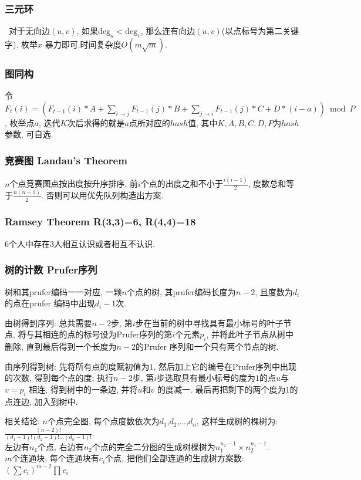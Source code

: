 \subsubsection{三元环}\
			   对于无向边$(u,v)$, 如果$\mathrm{deg}_u<\mathrm{deg}_v$, 那么连有向边$(u,v)$(以点标号为第二关键字). 枚举$x$ 暴力即可.时间复杂度$O(m\sqrt{m})$. 
\subsubsection{图同构}
				令$F_t(i)=(F_{t-1}(i)*A+\sum_{i\to j} F_{t-1}(j)*B+\sum_{j\to i} F_{t-1}(j)*C+D*(i-a)) \bmod P$, 枚举点$a$, 迭代$K$次后求得的就是$a$点所对应的$hash$值, 其中$K,A,B,C,D,P$为$hash$参数, 可自选. 

\subsubsection{竞赛图 Landau's Theorem}
	$n$个点竞赛图点按出度按升序排序, 前$i$个点的出度之和不小于$\frac{i(i-1)}{2}$, 度数总和等于$\frac{n(n-1)}{2}$. 否则可以用优先队列构造出方案.

\subsubsection{Ramsey Theorem R(3,3)=6, R(4,4)=18}
	$6$个人中存在$3$人相互认识或者相互不认识.

\subsubsection{树的计数 Prufer序列}
	树和其prufer编码一一对应, 一颗$n$个点的树, 其prufer编码长度为${n-2}$, 且度数为$d_i$ 的点在prufer 编码中出现${d_i -1}$次. 
	\par 由树得到序列: 总共需要$n-2$步, 第$i$步在当前的树中寻找具有最小标号的叶子节点, 将与其相连的点的标号设为Prufer序列的第$i$个元素$p_i$, 并将此叶子节点从树中删除, 直到最后得到一个长度为$n-2$的Prufer 序列和一个只有两个节点的树. 
	\par 由序列得到树: 先将所有点的度赋初值为$1$, 然后加上它的编号在Prufer序列中出现的次数, 得到每个点的度; 执行$n-2$步, 第$i$步选取具有最小标号的度为$1$的点$u$与$v=p_i$ 相连, 得到树中的一条边, 并将$u$和$v$ 的度减一. 最后再把剩下的两个度为$1$的点连边, 加入到树中. 
	\par 相关结论: $n$个点完全图, 每个点度数依次为$d_1$,$d_2$,...,$d_n$, 这样生成树的棵树为: ${\frac{(n-2)!}{(d_1-1)!(d_2-1)!...(d_n-1)!}}$.\\
	左边有$n_1$个点, 右边有$n_2$个点的完全二分图的生成树棵树为$n_1^{n_2-1}\times n_2^{n_1-1}$. \\
	$m$个连通块, 每个连通块有$c_i$个点, 把他们全部连通的生成树方案数: $(\sum c_i)^{m-2}\prod c_i$
